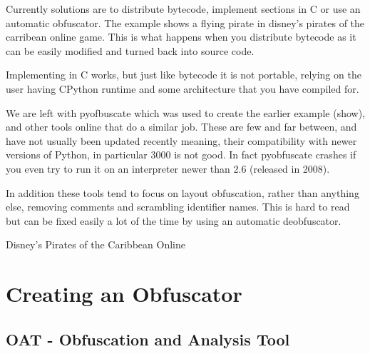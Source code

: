 Currently solutions are to distribute bytecode, implement sections in C or use an automatic obfuscator. The example shows a flying pirate in disney's pirates of
the carribean online game. This is what happens when you distribute bytecode as it can be easily modified and turned back into source code. 

Implementing in C works, but just like bytecode it is not portable, relying on the user having CPython runtime and some architecture that you have compiled for.

We are left with pyofbuscate which was used to create the earlier example (show), and other tools online that do a similar job. These are few and far between, and have
not usually been updated recently meaning, their compatibility with newer versions of Python, in particular 3000 is not good. In fact pyobfuscate crashes if you
even try to run it on an interpreter newer than 2.6 (released in 2008).

In addition these tools tend to focus on layout obfuscation, rather than anything else, removing comments and scrambling identifier names. This is hard to read
but can be fixed easily a lot of the time by using an automatic deobfuscator.

\begin{frame}[plain]{Disney's Pirates of the Caribbean Online}
\end{frame}





\section{Creating an Obfuscator}

\subsection{OAT - Obfuscation and Analysis Tool}

